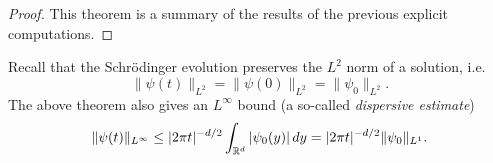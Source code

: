 \begin{proof}
  This theorem is a summary of the results of
  the previous explicit computations.
\end{proof}

\begin{remark}
  Recall that the Schr\"odinger evolution
  preserves the $L^2$ norm of a solution, i.e.
  \[
    \|\psi(t)\|_{L^2} = \|\psi(0)\|_{L^2} = \|\psi_0\|_{L^2}.
  \]
  The above theorem also gives an $L^\infty$ bound
  (a so-called \emph{dispersive estimate})
  \[
    \|\psi(t)\|_{L^\infty}
    \le |2\pi t|^{-d / 2} \int_{\mathbb{R}^d} |\psi_0(y)|\, dy
    = |2\pi t|^{-d / 2} \|\psi_0\|_{L^1}.
  \]
\end{remark}
